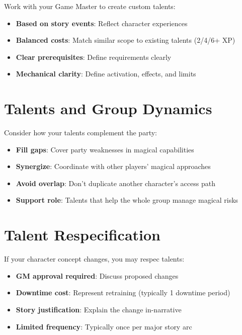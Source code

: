 Work with your Game Master to create custom talents:
\begin{itemize}
\item \textbf{Based on story events}: Reflect character experiences
\item \textbf{Balanced costs}: Match similar scope to existing talents (2/4/6+ XP)
\item \textbf{Clear prerequisites}: Define requirements clearly
\item \textbf{Mechanical clarity}: Define activation, effects, and limits
\end{itemize}

\section{Talents and Group Dynamics}

Consider how your talents complement the party:
\begin{itemize}
\item \textbf{Fill gaps}: Cover party weaknesses in magical capabilities
\item \textbf{Synergize}: Coordinate with other players' magical approaches
\item \textbf{Avoid overlap}: Don't duplicate another character's access path
\item \textbf{Support role}: Talents that help the whole group manage magical risks
\end{itemize}

\section{Talent Respecification}

If your character concept changes, you may respec talents:
\begin{itemize}
\item \textbf{GM approval required}: Discuss proposed changes
\item \textbf{Downtime cost}: Represent retraining (typically 1 downtime period)
\item \textbf{Story justification}: Explain the change in-narrative
\item \textbf{Limited frequency}: Typically once per major story arc
\end{itemize}

